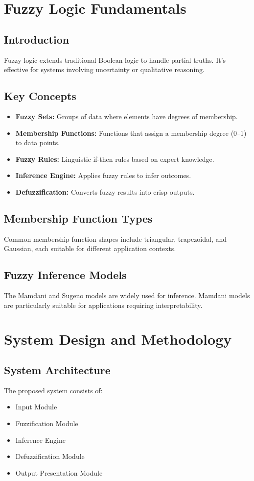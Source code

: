 \documentclass[a4paper]{article}
\begin{document}
\section{Fuzzy Logic Fundamentals}
\subsection{Introduction}
Fuzzy logic extends traditional Boolean logic to handle partial truths. It’s effective for systems involving uncertainty or qualitative reasoning.

\subsection{Key Concepts}
\begin{itemize}
\item \textbf{Fuzzy Sets:} Groups of data where elements have degrees of membership.
\item \textbf{Membership Functions:} Functions that assign a membership degree (0–1) to data points.
\item \textbf{Fuzzy Rules:} Linguistic if-then rules based on expert knowledge.
\item \textbf{Inference Engine:} Applies fuzzy rules to infer outcomes.
\item \textbf{Defuzzification:} Converts fuzzy results into crisp outputs.
\end{itemize}

\subsection{Membership Function Types}
Common membership function shapes include triangular, trapezoidal, and Gaussian, each suitable for different application contexts.

\subsection{Fuzzy Inference Models}
The Mamdani and Sugeno models are widely used for inference. Mamdani models are particularly suitable for applications requiring interpretability.

\section{System Design and Methodology}
\subsection{System Architecture}
The proposed system consists of:
\begin{itemize}
\item Input Module
\item Fuzzification Module
\item Inference Engine
\item Defuzzification Module
\item Output Presentation Module
\end{itemize}
\end{document}
